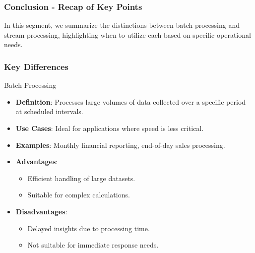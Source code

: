 \documentclass[aspectratio=169]{beamer}
\begin{document}
\begin{frame}[fragile]
    \frametitle{Conclusion - Recap of Key Points}
    In this segment, we summarize the distinctions between batch processing and stream processing, highlighting when to utilize each based on specific operational needs.
\end{frame}

\begin{frame}[fragile]
    \frametitle{Key Differences}
    \begin{block}{Batch Processing}
        \begin{itemize}
            \item \textbf{Definition}: Processes large volumes of data collected over a specific period at scheduled intervals.
            \item \textbf{Use Cases}: Ideal for applications where speed is less critical.
            \item \textbf{Examples}: Monthly financial reporting, end-of-day sales processing.
            \item \textbf{Advantages}:
            \begin{itemize}
                \item Efficient handling of large datasets.
                \item Suitable for complex calculations.
            \end{itemize}
            \item \textbf{Disadvantages}:
            \begin{itemize}
                \item Delayed insights due to processing time.
                \item Not suitable for immediate response needs.
            \end{itemize}
        \end{itemize}
    \end{block}


\end{frame}
\end{document}
